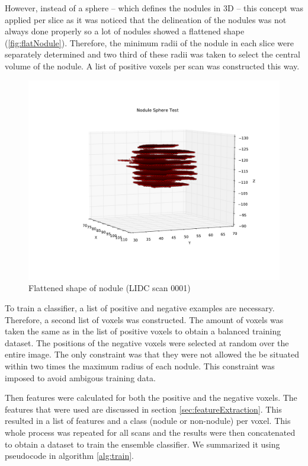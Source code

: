 However, instead of a sphere -- which defines the nodules in 3D -- this concept
was applied per slice as it was noticed that the delineation of the nodules was
not always done properly so a lot of nodules showed a flattened shape
(\autoref{fig:flatNodule}).
Therefore, the minimum radii of the nodule in each slice were separately
determined and two third of these radii was taken to select the central volume
of the nodule. A list of positive voxels per scan was constructed this way.
\begin{figure}[ht]
 \begin{center}
    \includegraphics[width=\linewidth, trim=150 0 0 0]{img/NoduleSphereTest_0001.pdf}
    \caption{Flattened shape of nodule (LIDC scan 0001)}
    \label{fig:flatNodule}
 \end{center}
\end{figure}

To train a classifier, a list of positive and negative
examples are necessary. Therefore, a second list of voxels was constructed. The
amount of voxels was taken the same as in the list of positive voxels to obtain
a balanced training dataset. The positions of the negative voxels were selected
at random over the entire image. The only constraint was that they were not
allowed the be situated within two times the maximum radius of each nodule. This
constraint was imposed to avoid ambigous training data.

Then features were calculated for both the positive and the negative voxels. The
features that were used are discussed in section \ref{sec:featureExtraction}.
This resulted in a list of features and a class (nodule or non-nodule) per
voxel. This whole process was repeated for all scans and the results were then
concatenated to obtain a dataset to train the ensemble classifier. We summarized
it using pseudocode in algorithm \ref{alg:train}.

